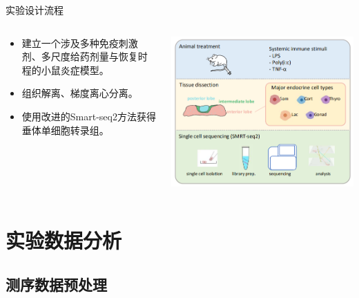 \documentclass{beamer}
\begin{document}
\begin{frame}{实验设计流程}
  \begin{columns}
    \begin{column}{.5\linewidth}
      \begin{itemize}
        \item 建立一个涉及多种免疫刺激剂、多尺度给药剂量与恢复时程的小鼠炎症模型。
        \item 组织解离、梯度离心分离。
        \item 使用改进的Smart-seq2方法获得垂体单细胞转录组。
      \end{itemize}
    \end{column}

    \begin{column}{.5\linewidth}
      \includegraphics[width=\linewidth]{figs/expr-design.png}
    \end{column}
  \end{columns}
\end{frame}

\section{实验数据分析}

\subsection{测序数据预处理}
\end{document}
